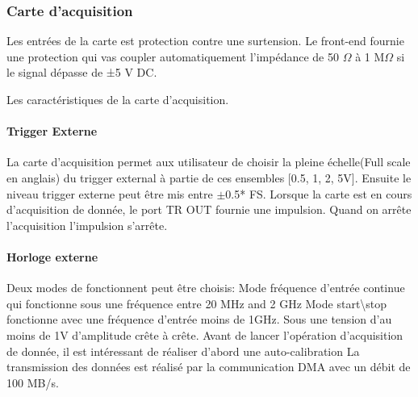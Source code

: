 \subsubsection{Carte d'acquisition}

Les entrées de la carte est protection contre une surtension. Le front-end fournie une protection qui vas coupler automatiquement l'impédance de 50 $\Omega$ à 1 M$\Omega$ si le signal dépasse de ±5 V DC.

Les caractéristiques de la carte d'acquisition.

\paragraph{Trigger Externe}

La carte d'acquisition permet aux utilisateur de choisir la pleine échelle(Full scale en anglais) du trigger external à partie de ces ensembles [0.5, 1, 2, 5V]. Ensuite le niveau trigger externe peut être mis entre $\pm$0.5* FS.
Lorsque la carte est en cours d'acquisition de donnée, le port TR OUT fournie une impulsion. Quand on arrête l'acquisition l'impulsion s'arrête.  

\paragraph{Horloge externe}
Deux modes de fonctionnent peut être choisis: Mode fréquence d'entrée continue qui fonctionne sous une fréquence entre 20 MHz and 2 GHz
Mode start\textbackslash stop fonctionne avec une fréquence d'entrée moins de 1GHz. Sous une tension d'au moins de 1V d'amplitude crête à crête.
Avant de lancer l'opération d'acquisition de donnée, il est intéressant de réaliser d'abord une auto-calibration
La transmission des données est réalisé par la communication DMA avec un débit de 100 MB/s.
